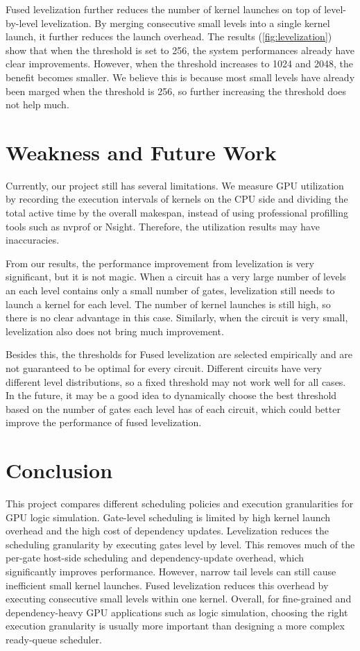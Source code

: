 \documentclass[sigconf,screen,nonacm]{acmart}
\begin{document}
    Fused levelization further reduces the number of kernel launches on top of level-by-level levelization. By merging consecutive small levels into a single kernel launch, it further reduces the launch overhead. The results (\autoref{fig:levelization}) show that when the threshold is set to 256, the system performances already have clear improvements. However, when the threshold increases to 1024 and 2048, the benefit becomes smaller. We believe this is because most small levels have already been marged when the threshold is 256, so further increasing the threshold does not help much.

\section{Weakness and Future Work}
\label{sec:future work}
Currently, our project still has several limitations. We measure GPU utilization by recording the execution intervals of kernels on the CPU side and dividing the total active time by the overall makespan, instead of using professional profilling tools such as nvprof or Nsight. Therefore, the utilization results may have inaccuracies. 

From our results, the performance improvement from levelization is very significant, but it is not magic. When a circuit has a very large number of levels an each level contains only a small number of gates, levelization still needs to launch a kernel for each level. The number of kernel launches is still high, so there is no clear advantage in this case. Similarly, when the circuit is very small, levelization also does not bring much improvement. 

Besides this, the thresholds for Fused levelization are selected empirically and are not guaranteed to be optimal for every circuit. Different circuits have very different level distributions, so a fixed threshold may not work well for all cases. In the future, it may be a good idea to dynamically choose the best threshold based on the number of gates each level has of each circuit, which could better improve the performance of fused levelization.




\section{Conclusion}
\label{sec:conclusion}
This project compares different scheduling policies and execution granularities for GPU logic simulation. Gate-level scheduling is limited by high kernel launch overhead and the high cost of dependency updates. Levelization reduces the scheduling granularity by executing gates level by level. This removes much of the per-gate host-side scheduling and dependency-update overhead, which significantly improves performance. However, narrow tail levels can still cause inefficient small kernel launches. Fused levelization reduces this overhead by executing consecutive small levels within one kernel. Overall, for fine-grained and dependency-heavy GPU applications such as logic simulation, choosing the right execution granularity is usually more important than designing a more complex ready-queue scheduler.



\end{document}
